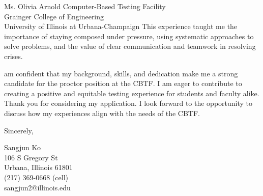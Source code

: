 \documentclass{letter}
\begin{document}
\begin{letter}{Ms. Olivia Arnold
    Computer-Based Testing Facility\\
    Grainger College of Engineering\\
    University of Illinois at Urbana-Champaign
}
This experience taught me the importance of staying composed under pressure, using systematic approaches to solve problems, and the value of clear communication and teamwork in resolving crises.

am confident that my background, skills, and dedication make me a strong candidate for the proctor position at the CBTF. I am eager to contribute to creating a positive and equitable testing experience for students and faculty alike. Thank you for considering my application. I look forward to the opportunity to discuss how my experiences align with the needs of the CBTF.

\closing{Sincerely,
}

Sangjun Ko\\
106 S Gregory St\\
Urbana, Illinois 61801\\
(217) 369-0668 (cell)\\sangjun2@illinois.edu
\end{letter}
\end{document}
